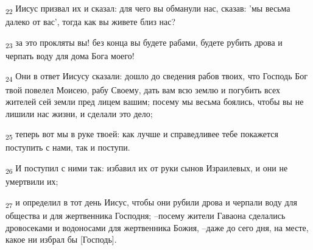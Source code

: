 \begin{tcolorbox}
\textsubscript{22} Иисус призвал их и сказал: для чего вы обманули нас, сказав: 'мы весьма далеко от вас', тогда как вы живете близ нас?
\end{tcolorbox}
\begin{tcolorbox}
\textsubscript{23} за это прокляты вы! без конца вы будете рабами, будете рубить дрова и черпать воду для дома Бога моего!
\end{tcolorbox}
\begin{tcolorbox}
\textsubscript{24} Они в ответ Иисусу сказали: дошло до сведения рабов твоих, что Господь Бог твой повелел Моисею, рабу Своему, дать вам всю землю и погубить всех жителей сей земли пред лицем вашим; посему мы весьма боялись, чтобы вы не лишили нас жизни, и сделали это дело;
\end{tcolorbox}
\begin{tcolorbox}
\textsubscript{25} теперь вот мы в руке твоей: как лучше и справедливее тебе покажется поступить с нами, так и поступи.
\end{tcolorbox}
\begin{tcolorbox}
\textsubscript{26} И поступил с ними так: избавил их от руки сынов Израилевых, и они не умертвили их;
\end{tcolorbox}
\begin{tcolorbox}
\textsubscript{27} и определил в тот день Иисус, чтобы они рубили дрова и черпали воду для общества и для жертвенника Господня; --посему жители Гаваона сделались дровосеками и водоносами для жертвенника Божия, --даже до сего дня, на месте, какое ни избрал бы [Господь].
\end{tcolorbox}
